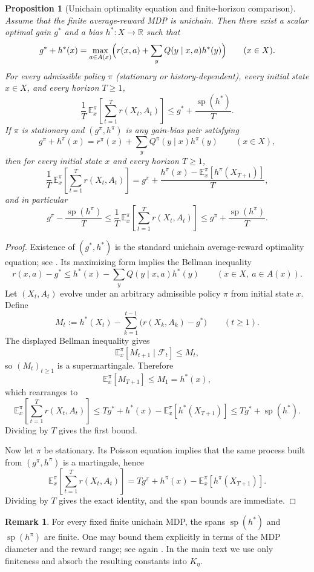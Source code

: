 \documentclass[12pt]{article}
\newtheorem{proposition}[theorem]{Proposition}
\theoremstyle{definition}
\newtheorem{remark}[theorem]{Remark}
\newcommand{\R}{\mathbb{R}}
\newcommand{\E}{\mathbb{E}}
\newcommand{\1}{\mathbf{1}}
\newcommand{\cF}{\mathcal{F}}
\DeclareMathOperator{\spn}{sp}
\begin{document}
\begin{proposition}[Unichain optimality equation and finite-horizon comparison]
\label{prop:unichain-horizon}
Assume that the finite average-reward MDP is unichain. Then there exist a scalar
optimal gain $g^*$ and a bias $h^*:X\to\R$ such that
\[
g^*+h^*(x)=\max_{a\in A(x)}\Bigl(r(x,a)+\sum_y Q(y\mid x,a)h^*(y)\Bigr)
\qquad (x\in X).
\]
For every admissible policy $\pi$ (stationary or history-dependent), every
initial state $x\in X$, and every horizon $T\ge 1$,
\[
\frac1T\,\E_x^\pi\!\left[\sum_{t=1}^T r(X_t,A_t)\right]
\le
g^*+\frac{\spn(h^*)}{T}.
\]
If $\pi$ is stationary and $(g^\pi,h^\pi)$ is any gain-bias pair satisfying
\[
g^\pi+h^\pi(x)=r^\pi(x)+\sum_y Q^\pi(y\mid x)h^\pi(y)
\qquad (x\in X),
\]
then for every initial state $x$ and every horizon $T\ge 1$,
\[
\frac1T\,\E_x^\pi\!\left[\sum_{t=1}^T r(X_t,A_t)\right]
=
g^\pi+\frac{h^\pi(x)-\E_x^\pi[h^\pi(X_{T+1})]}{T},
\]
and in particular
\[
g^\pi-\frac{\spn(h^\pi)}{T}
\le
\frac1T\,\E_x^\pi\!\left[\sum_{t=1}^T r(X_t,A_t)\right]
\le
g^\pi+\frac{\spn(h^\pi)}{T}.
\]
\end{proposition}

\begin{proof}
Existence of $(g^*,h^*)$ is the standard unichain average-reward optimality
equation; see \cite[Chapter~8]{Puterman1994}. Its maximizing form implies the
Bellman inequality
\[
r(x,a)-g^*
\le
h^*(x)-\sum_y Q(y\mid x,a)h^*(y)
\qquad (x\in X,\ a\in A(x)).
\]
Let $(X_t,A_t)$ evolve under an arbitrary admissible policy $\pi$ from initial
state $x$. Define
\[
M_t:=h^*(X_t)-\sum_{k=1}^{t-1}\bigl(r(X_k,A_k)-g^*\bigr)
\qquad (t\ge 1).
\]
The displayed Bellman inequality gives
\[
\E_x^\pi[M_{t+1}\mid \cF_t]\le M_t,
\]
so $(M_t)_{t\ge 1}$ is a supermartingale. Therefore
\[
\E_x^\pi[M_{T+1}]\le M_1=h^*(x),
\]
which rearranges to
\[
\E_x^\pi\!\left[\sum_{t=1}^T r(X_t,A_t)\right]
\le
Tg^*+h^*(x)-\E_x^\pi[h^*(X_{T+1})]
\le
Tg^*+\spn(h^*).
\]
Dividing by $T$ gives the first bound.

Now let $\pi$ be stationary. Its Poisson equation implies that the same process
built from $(g^\pi,h^\pi)$ is a martingale, hence
\[
\E_x^\pi\!\left[\sum_{t=1}^T r(X_t,A_t)\right]
=
Tg^\pi+h^\pi(x)-\E_x^\pi[h^\pi(X_{T+1})].
\]
Dividing by $T$ gives the exact identity, and the span bounds are immediate.
\end{proof}

\begin{remark}
For every fixed finite unichain MDP, the spans $\spn(h^*)$ and $\spn(h^\pi)$ are
finite. One may bound them explicitly in terms of the MDP diameter and the reward
range; see again \cite[Chapter~8]{Puterman1994}. In the main text we use only
finiteness and absorb the resulting constants into $K_\eta$.
\end{remark}
\end{document}
